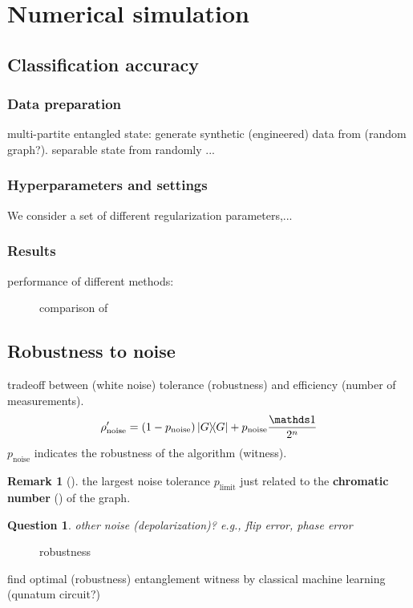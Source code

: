 \documentclass[
10pt,
aps,
pra,
linenumbers,
floatfix,
]{revtex4-2}
\theoremstyle{plain}
\newtheorem{question}{Question}
\theoremstyle{definition}
\newtheorem{remark}{Remark}
\newcommand{\noise}{\text{noise}}
\newcommand{\dm}{\rho}
\begin{document}
\section{Numerical simulation}
\subsection{Classification accuracy}
\subsubsection{Data preparation}
multi-partite entangled state: generate synthetic (engineered) data from (random graph?).
separable state from randomly ...

\subsubsection{Hyperparameters and settings}
We consider a set of different regularization parameters,...

\subsubsection{Results}
performance of different methods: 
\begin{figure}[!ht]
	\centering
	\caption{comparison of }
\end{figure}

\subsection{Robustness to noise}
tradeoff between (white noise) tolerance (robustness) and efficiency (number of measurements).
\begin{equation}
	\dm_{\noise}' = (1-p_{\noise}) \op{G} + p_{\noise} \frac{\identity}{2^n}
\end{equation}
$p_{\noise}$ indicates the robustness of the algorithm (witness).
\begin{remark}[\cite{zhouDetectingMultipartiteEntanglement2019}]
	the largest noise tolerance $p_{\text{limit}}$ just related to the \textbf{chromatic number} () of the graph.
\end{remark}
\begin{question}
	other noise (depolarization)? e.g., flip error, phase error
\end{question}
\begin{figure}[!ht]
	\centering
	\caption{robustness }
\end{figure}
find optimal (robustness) entanglement witness by classical machine learning (qunatum circuit?)
\end{document}
